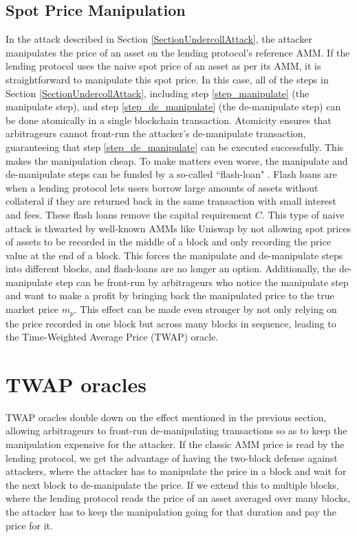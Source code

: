 \documentclass[conference]{IEEEtran}
\begin{document}
\subsection{Spot Price Manipulation}
In the attack described in Section \ref{SectionUndercollAttack}, the attacker manipulates the price of an asset on the lending protocol's reference AMM. If the lending protocol uses the naive spot price of an asset as per its AMM, it is straightforward to manipulate this spot price.
In this case, all of the steps in Section \ref{SectionUndercollAttack}, including step \ref{step_manipulate} (the manipulate step), and step \ref{step_de_manipulate} (the de-manipulate step) can be done atomically in a single blockchain transaction. Atomicity ensures that arbitrageurs cannot front-run the attacker's de-manipulate transaction, guaranteeing that step \ref{step_de_manipulate} can be executed successfully. This makes the manipulation cheap. To make matters even worse, the manipulate and de-manipulate steps can be funded by a so-called ``flash-loan" \cite{qin2021attacking}. Flash loans are when a lending protocol lets users borrow large amounts of assets without collateral if they are returned back in the same transaction with small interest and fees. These flash loans remove the capital requirement $C$. This type of naive attack is thwarted by well-known AMMs like Uniswap \cite{Adams2020UniV2} by not allowing spot prices of assets to be recorded in the middle of a block and only recording the price value at the end of a block. This forces the manipulate and de-manipulate steps into different blocks, and flash-loans are no longer an option. Additionally, the de-manipulate step can be front-run by arbitrageurs who notice the manipulate step and want to make a profit by bringing back the manipulated price to the true market price $m_p$. This effect can be made even stronger by not only relying on the price recorded in one block but across many blocks in sequence, leading to the Time-Weighted Average Price (TWAP) oracle.

\section{TWAP oracles}
TWAP oracles double down on the effect mentioned in the previous section, allowing arbitrageurs to front-run de-manipulating transactions so as to keep the manipulation expensive for the attacker. If the classic AMM price is read by the lending protocol, we get the advantage of having the two-block defense against attackers, where the attacker has to manipulate the price in a block and wait for the next block to de-manipulate the price. If we extend this to multiple blocks, where the lending protocol reads the price of an asset averaged over many blocks, the attacker has to keep the manipulation going for that duration and pay the price for it.
\end{document}
